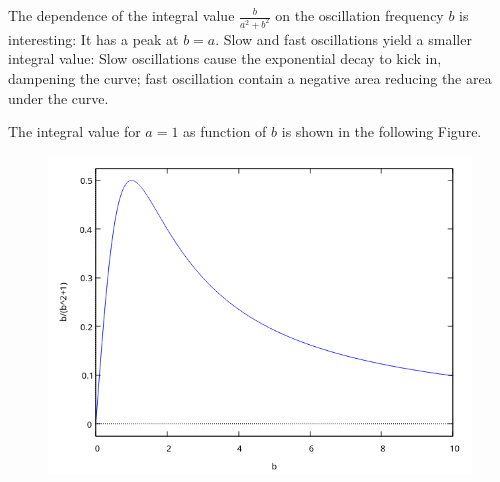 The dependence of the integral value $\frac{b}{a^2 + b^2}$ on the oscillation frequency $b$ is interesting: It has a peak at $b = a$. Slow and fast oscillations yield a smaller integral value: Slow oscillations cause the exponential decay to kick in, dampening the curve; fast oscillation contain a negative area reducing the area under the curve.

The integral value for $a = 1$ as function of $b$ is shown in the following Figure.

\begin{figure}[H]
    \includegraphics[scale=0.7]{images/2022-04-05_plot_2.png}
\end{figure}


